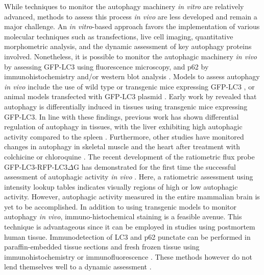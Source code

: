 While techniques to monitor the autophagy machinery \textit{in vitro} are relatively advanced, methods to assess this process \textit{in vivo} are less developed and remain a major challenge. An \textit{in vitro}-based approach favors the implementation of various molecular techniques such as transfections, live cell imaging, quantitative morphometric analysis, and the dynamic assessment of key autophagy proteins involved. Nonetheless, it is possible to monitor the autophagic machinery \textit{in vivo} by assessing GFP-LC3 using fluorescence microscopy, and p62 by immunohistochemistry and/or western blot analysis \citep{klionsky2016}. Models to assess autophagy \textit{in vivo} include the use of wild type or transgenic mice expressing GFP-LC3 \citep{Mizushima2004a,Rodriguez-Muela2012}, or animal models transfected with GFP-LC3 plasmid \citep{Mammucari2007}. Early work by \citet{Mizushima2004a} revealed that autophagy is differentially induced in tissues using transgenic mice expressing GFP-LC3. In line with these findings, previous work has shown differential regulation of autophagy in tissues, with the liver exhibiting high autophagic activity compared to the spleen \citep{Haspel2011}. Furthermore, other studies have monitored changes in autophagy in skeletal muscle and the heart after treatment with colchicine \citep{Ju2010} or chloroquine \citep{Kanamori2015}. The recent development of the ratiometric flux probe GFP-LC3-RFP-LC3$\Delta$G has demonstrated for the first time the successful assessment of autophagic activity \textit{in vivo} \citep{Kaizuka2016}. Here, a ratiometric assessment using intensity lookup tables indicates visually regions of high or low autophagic activity. However, autophagic activity measured in the entire mammalian brain is yet to be accomplished. In addition to using transgenic models to monitor autophagy \textit{in vivo}, immuno-histochemical staining is a feasible avenue. This technique is advantageous since it can be employed in studies using postmortem human tissue. Immunodetection of LC3 and p62 punctate can be performed in paraffin-embedded tissue sections and fresh frozen tissue using immunohistochemistry or immunofluorescence \citep{He2016,Holt2011,Martinet2006,Schlafli2015}. These methods however do not lend themselves well to a dynamic assessment \citep{klionsky2016}.

